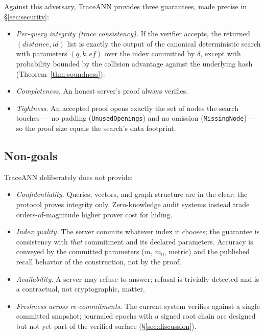 \documentclass[11pt]{article}
\newcommand{\sys}{TraceANN}
\begin{document}
Against this adversary, \sys{} provides three guarantees, made precise
in \S\ref{sec:security}:

\begin{itemize}
\item \emph{Per-query integrity (trace consistency).} If the verifier
  accepts, the returned $(\mathit{distance},\mathit{id})$ list is
  exactly the output of the canonical deterministic search with
  parameters $(q, k, \mathit{ef})$ over the index committed by $\delta$,
  except with probability bounded by the collision advantage against the
  underlying hash (Theorem~\ref{thm:soundness}).
\item \emph{Completeness.} An honest server's proof always verifies.
\item \emph{Tightness.} An accepted proof opens exactly the set of nodes
  the search touches --- no padding (\texttt{UnusedOpenings}) and no
  omission (\texttt{MissingNode}) --- so the proof size equals the
  search's data footprint.
\end{itemize}

\subsection{Non-goals}

\sys{} deliberately does not provide:

\begin{itemize}
\item \emph{Confidentiality.} Queries, vectors, and graph structure are
  in the clear; the protocol proves integrity only. Zero-knowledge audit
  systems instead trade orders-of-magnitude higher prover cost for
  hiding.
\item \emph{Index quality.} The server commits whatever index it
  chooses; the guarantee is consistency with \emph{that} commitment and
  its declared parameters. Accuracy is conveyed by the committed
  parameters ($m$, $m_0$, metric) and the published recall behavior of
  the construction, not by the proof.
\item \emph{Availability.} A server may refuse to answer; refusal is
  trivially detected and is a contractual, not cryptographic, matter.
\item \emph{Freshness across re-commitments.} The current system
  verifies against a single committed snapshot; journaled epochs with a
  signed root chain are designed but not yet part of the verified
  surface (\S\ref{sec:discussion}).
\end{itemize}
\end{document}
